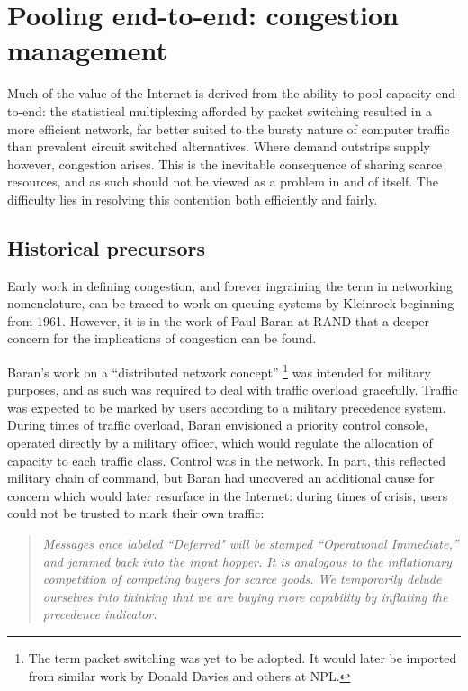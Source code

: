 \section{Pooling end-to-end: congestion management}
\label{sec:resourcepooling:congestion}

Much of the value of the Internet is derived from the ability to pool capacity end-to-end: the statistical multiplexing afforded by packet switching resulted in a more efficient network, far better suited to the bursty nature of computer traffic than prevalent circuit switched alternatives. 
Where demand outstrips supply however, congestion arises. 
This is the inevitable consequence of sharing scarce resources, and as such should not be viewed as a problem in and of itself. 
The difficulty lies in resolving this contention both efficiently and fairly. 

\subsection{Historical precursors}

Early work in defining congestion, and forever ingraining the term in networking nomenclature, can be traced to work on queuing systems by Kleinrock \cite{Kleinrock:1975} beginning from 1961. 
However, it is in the work of Paul Baran at \acs{RAND} \cite{Baran:1964p451} that a deeper concern for the implications of congestion can be found. 

Baran's work on a ``distributed network concept'' \footnote{The term packet switching was yet to be adopted. It would later be imported from similar work by Donald Davies and others at \acs{NPL}.} was intended for military purposes, and as such was required to deal with traffic overload gracefully.
Traffic was expected to be marked by users according to a military precedence system. During times of traffic overload, Baran envisioned a priority control console, operated directly by a military officer, which would regulate the allocation of capacity to each traffic class.
Control was in the network. In part, this reflected military chain of command, but Baran had uncovered an additional cause for concern which would later resurface in the Internet: during times of crisis, users could not be trusted to mark their own traffic:

\begin{quote}
\textit{
Messages once labeled ``Deferred" will be stamped ``Operational Immediate,'' and jammed back into the input hopper. It is analogous to the inflationary competition of competing buyers for scarce goods. We temporarily delude ourselves into thinking that we are buying more capability by inflating the precedence indicator.
}
\end{quote}


